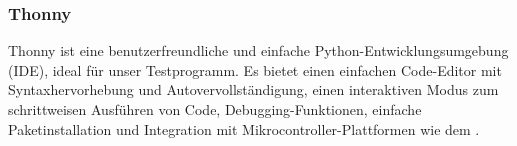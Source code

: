 \subsubsection{Thonny}\label{sec:thonny} 
\begin{figwindow}
Thonny\autocite{Thonny} ist eine benutzerfreundliche und einfache Python-Entwicklungsumgebung (IDE), ideal für unser Testprogramm. Es bietet einen einfachen Code-Editor mit Syntaxhervorhebung und Autovervollständigung, einen interaktiven Modus zum schrittweisen Ausführen von Code, Debugging-Funktionen, einfache Paketinstallation und Integration mit Mikrocontroller-Plattformen wie dem \raspi.
\end{figwindow}